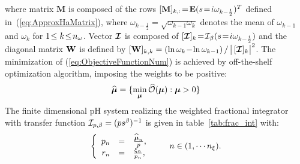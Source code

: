 \documentclass[10pt,a4paper]{article}
\begin{document}
where matrix $\mathbf M$ is composed of the rows
$[\mathbf M]_{k,:}\!=\!\mathbf E (s\!=\!{\dot\iota}\omega_{k-\frac{1}{2}})^T$
defined in~(\ref{eq:ApproxHaMatrix}), where $\omega_{k-\frac{1}{2}}\!=\!\sqrt{
  \omega_{k-1} \omega_k}$ denotes the mean of $\omega_{k-1}$
and $\omega_k$ for $1\!\leq k\!\leq\! {n_\omega}$. 
Vector $\boldsymbol{{\mathcal{I}}}$ is composed of
$[\boldsymbol{{\mathcal{I}}}]_k\!=\!{{\mathcal{I}}}_\beta(s\!=\!{\dot\iota}\omega_{k-\frac{1}{2}})$ and
the diagonal
matrix ${\mathbf{W}}$ is defined by $[{\mathbf{W}}]_{k,k}=(\ln \omega_{k} \!-\! \ln
\omega_{k-1})\,/\, \big|\, [\boldsymbol{{\mathcal{I}}}]_k \big|^2$.
The minimization of (\ref{eq:ObjectiveFunctionNum}) is achieved by off-the-shelf optimization algorithm, imposing the weights to be positive: 
\begin{equation}
\label{eq:minimization}
 \widehat{\boldsymbol{\mu}} = \{\min_{\boldsymbol{\mu}}  \widehat{\mathcal{O}}(\boldsymbol{\mu}) : \boldsymbol{\mu}>0\}
\end{equation}
The finite dimensional pH system realizing the weighted fractional integrator with transfer function ${\mathcal{I}}_{p,\beta} = (ps^\beta)^{-1}$ is given in table~\ref{tab:frac_int} with:
\begin{equation}
\label{eq:frac_int_parameters}
\left\{\begin{array}{rcl}
p_n&=&\frac{\widehat{\boldsymbol{\mu}}_n}{p},\\
r_n&=&\frac{\xi_n}{p_n},
\end{array}\right.\qquad n \in (1,\cdots {n_\xi}).
\end{equation}
%
\end{document}

